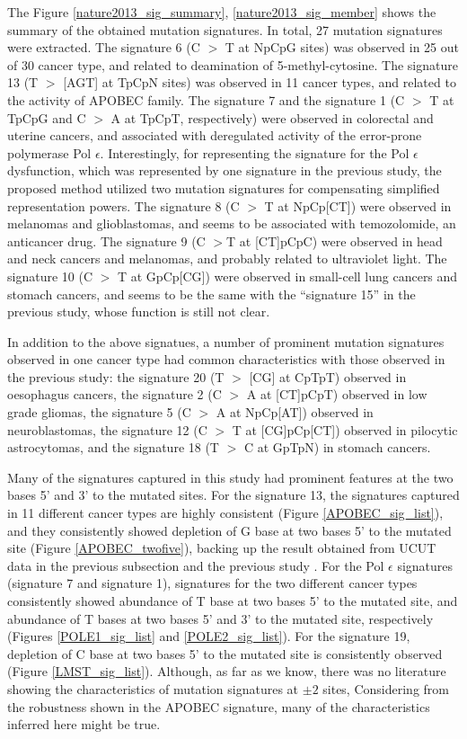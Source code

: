 The Figure \ref{nature2013_sig_summary},  \ref{nature2013_sig_member} shows the summary of the obtained mutation signatures.
In total, 27 mutation signatures were extracted.
The signature 6 (C $>$ T at NpCpG sites) was observed in 25 out of 30 cancer type, and related to deamination of 5-methyl-cytosine.
The signature 13 (T $>$ [AGT] at TpCpN sites) was observed in 11 cancer types, and related to the activity of APOBEC family.
The signature 7 and the signature 1 (C $>$ T at TpCpG and C $>$ A at TpCpT, respectively) were observed in colorectal and uterine cancers,
and associated with deregulated activity of the error-prone polymerase Pol $\epsilon$.
Interestingly, for representing the signature for the Pol $\epsilon$ dysfunction, which was represented by one signature in the previous study,
the proposed method utilized two mutation signatures for compensating simplified representation powers.
The signature 8 (C $>$ T at NpCp[CT]) were observed in melanomas and glioblastomas, 
and seems to be associated with temozolomide, an anticancer drug.
The signature 9 (C $>$T at [CT]pCpC) were observed in head and neck cancers and melanomas, and probably related to ultraviolet light.
The signature 10 (C $>$ T at GpCp[CG]) were observed in small-cell lung cancers and stomach cancers,
and seems to be the same with the ``signature 15'' in the previous study, whose function is still not clear.


In addition to the above signatues, a number of prominent mutation signatures observed in one cancer type 
had common characteristics with those observed in the previous study:
the signature 20 (T $>$ [CG] at CpTpT) observed in oesophagus cancers, 
the signature 2 (C $>$ A at [CT]pCpT) observed in low grade gliomas,
the signature 5 (C $>$ A at NpCp[AT]) observed in neuroblastomas,
the signature 12 (C $>$ T at [CG]pCp[CT]) observed in pilocytic astrocytomas, 
and the signature 18 (T $>$ C at GpTpN) in stomach cancers.


Many of the signatures captured in this study 
had prominent features at the two bases 5' and 3' to the mutated sites.
For the signature 13, the signatures captured in 11 different cancer types are highly consistent (Figure \ref{APOBEC_sig_list}),
and they consistently showed depletion of G base at two bases 5' to the mutated site (Figure \ref{APOBEC_twofive}),
backing up the result obtained from UCUT data in the previous subsection and the previous study  \cite{pmid23318258}.
For the Pol $\epsilon$ signatures (signature 7 and signature 1), 
signatures for the two different cancer types consistently showed abundance of T base at two bases 5' to the mutated site,
and abundance of T bases at two bases 5' and 3' to the mutated site, respectively (Figures \ref{POLE1_sig_list} and \ref{POLE2_sig_list}).
For the signature 19, depletion of C base at two bases 5' to the mutated site is consistently observed (Figure \ref{LMST_sig_list}).
Although, as far as we know, there was no literature showing the characteristics of mutation signatures at $\pm 2$ sites,
Considering from the robustness shown in the APOBEC signature, many of  the characteristics inferred here might be true.

